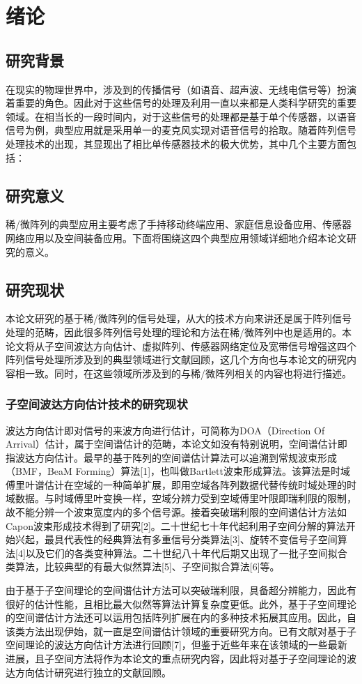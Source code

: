 \chapter{绪论}
\section{研究背景}
在现实的物理世界中，涉及到的传播信号（如语音、超声波、无线电信号等）扮演着重要的角色。因此对于这些信号的处理及利用一直以来都是人类科学研究的重要领域。在相当长的一段时间内，对于这些信号的处理都是基于单个传感器，以语音信号为例，典型应用就是采用单一的麦克风实现对语音信号的拾取。随着阵列信号处理技术的出现，其显现出了相比单传感器技术的极大优势，其中几个主要方面包括：
\section{研究意义}
稀/微阵列的典型应用主要考虑了手持移动终端应用、家庭信息设备应用、传感器网络应用以及空间装备应用。下面将围绕这四个典型应用领域详细地介绍本论文研究的意义。
\section{研究现状}
本论文研究的基于稀/微阵列的信号处理，从大的技术方向来讲还是属于阵列信号处理的范畴，因此很多阵列信号处理的理论和方法在稀/微阵列中也是适用的。本论文将从子空间波达方向估计、虚拟阵列、传感器网络定位及宽带信号增强这四个阵列信号处理所涉及到的典型领域进行文献回顾，这几个方向也与本论文的研究内容相一致。同时，在这些领域所涉及到的与稀/微阵列相关的内容也将进行描述。
\subsection{子空间波达方向估计技术的研究现状}
波达方向估计即对信号的来波方向进行估计，可简称为DOA（Direction Of Arrival）估计，属于空间谱估计的范畴，本论文如没有特别说明，空间谱估计即指波达方向估计。最早的基于阵列的空间谱估计算法可以追溯到常规波束形成（BMF，BeaM Forming）算法[1]，也叫做Bartlett波束形成算法。该算法是时域傅里叶谱估计在空域的一种简单扩展，即用空域各阵列数据代替传统时域处理的时域数据。与时域傅里叶变换一样，空域分辨力受到空域傅里叶限即瑞利限的限制，故不能分辨一个波束宽度内的多个信号源。接着突破瑞利限的空间谱估计方法如Capon波束形成技术得到了研究[2]。二十世纪七十年代起利用子空间分解的算法开始兴起，最具代表性的经典算法有多重信号分类算法[3]、旋转不变信号子空间算法[4]以及它们的各类变种算法。二十世纪八十年代后期又出现了一批子空间拟合类算法，比较典型的有最大似然算法[5]、子空间拟合算法[6]等。


由于基于子空间理论的空间谱估计方法可以突破瑞利限，具备超分辨能力，因此有很好的估计性能，且相比最大似然等算法计算复杂度更低。此外，基于子空间理论的空间谱估计方法还可以运用包括阵列扩展在内的多种技术拓展其应用。因此，自该类方法出现伊始，就一直是空间谱估计领域的重要研究方向。已有文献对基于子空间理论的波达方向估计方法进行回顾[7]，但鉴于近些年来在该领域的一些最新进展，且子空间方法将作为本论文的重点研究内容，因此将对基于子空间理论的波达方向估计研究进行独立的文献回顾。



